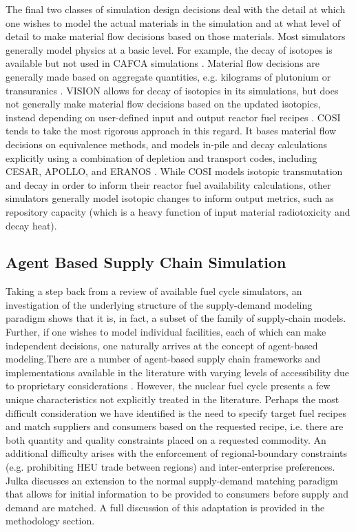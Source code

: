 The final two classes of simulation design decisions deal with the detail at
which one wishes to model the actual materials in the simulation and at what
level of detail to make material flow decisions based on those materials. Most
simulators generally model physics at a basic level. For example, the decay of
isotopes is available but not used in CAFCA
simulations \cite{guerin_impact_2009}. Material flow decisions are generally
made based on aggregate quantities, e.g. kilograms of plutonium or
transuranics \cite{busquim_e_silva_system_2008}. VISION allows for decay of
isotopics in its simulations, but does not generally make material flow
decisions based on the updated isotopics, instead depending on user-defined
input and output reactor fuel recipes \cite{jacobson_verifiable_2010}. COSI
tends to take the most rigorous approach in this regard. It bases material flow
decisions on equivalence methods, and models in-pile and decay calculations
explicitly using a combination of depletion and transport codes, including
CESAR, APOLLO, and ERANOS \cite{meyer_new_2009}. While COSI models isotopic
transmutation and decay in order to inform their reactor fuel availability
calculations, other simulators generally model isotopic changes to inform output
metrics, such as repository capacity (which is a heavy function of input
material radiotoxicity and decay heat).

\subsection{Agent Based Supply Chain Simulation}

Taking a step back from a review of available fuel cycle simulators, an
investigation of the underlying structure of the supply-demand modeling paradigm
shows that it is, in fact, a subset of the family of supply-chain
models. Further, if one wishes to model individual facilities, each of which can
make independent decisions, one naturally arrives at the concept of agent-based
modeling.There are a number of agent-based supply chain frameworks and
implementations available in the literature with varying levels of accessibility
due to proprietary
considerations \cite{swaminathan_modeling_1998,julka_agent-based_2002,van_der_zee_modeling_2005,chatfield_multi-formalism_2007}.
However, the nuclear fuel cycle presents a few unique characteristics not
explicitly treated in the literature. Perhaps the most difficult consideration
we have identified is the need to specify target fuel recipes and match
suppliers and consumers based on the requested recipe, i.e.  there are both
quantity and quality constraints placed on a requested commodity. An additional
difficulty arises with the enforcement of regional-boundary constraints
(e.g. prohibiting HEU trade between regions) and inter-enterprise
preferences. Julka \cite{julka_agent-based_2002} discusses an extension to the
normal supply-demand matching paradigm that allows for initial information to be
provided to consumers before supply and demand are matched. A full discussion of
this adaptation is provided in the methodology section.

